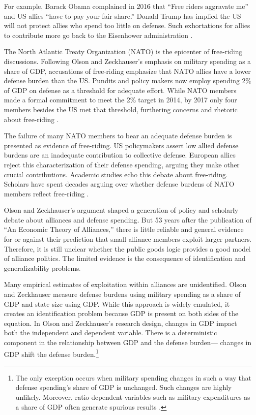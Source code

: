 \documentclass[12pt]{article}
\begin{document}
For example, Barack Obama complained in 2016 that ``Free riders aggravate me'' and US allies ``have to pay your fair share.'' 
Donald Trump has implied the US will not protect allies who spend too little on defense. 
Such exhortations for allies to contribute more go back to the Eisenhower administration \citep{Lanoszka2015}.


The North Atlantic Treaty Organization (NATO) is the epicenter of free-riding discussions. 
Following Olson and Zeckhauser's emphasis on military spending as a share of GDP, accusations of free-riding emphasize that NATO allies have a lower defense burden than the US. 
Pundits and policy makers now employ spending 2\% of GDP on defense as a threshold for adequate effort.
While NATO members made a formal commitment to meet the 2\% target in 2014, by 2017 only four members besides the US met that threshold, furthering concerns and rhetoric about free-riding \citep{EconomistNATO2017}. 


The failure of many NATO members to bear an adequate defense burden is presented as evidence of free-riding. 
US policymakers assert low allied defense burdens are an inadequate contribution to collective defense. 
European allies reject this characterization of their defense spending, arguing they make other crucial contributions. 
Academic studies echo this debate about free-riding.  
Scholars have spent decades arguing over whether defense burdens of NATO members reflect free-riding \citep{SandlerForbes1980, Palmer1990, GatesTerasawa1992, SandlerHartley2001, Lanoszka2015, PluemperNeumayer2015}.


Olson and Zeckhauser's argument shaped a generation of policy and scholarly debate about alliances and defense spending. 
But 53 years after the publication of ``An Economic Theory of Alliances,'' there is little reliable and general evidence for or against their prediction that small alliance members exploit larger partners. 
Therefore, it is still unclear whether the public goods logic provides a good model of alliance politics. 
The limited evidence is the consequence of identification and generalizability problems. 


Many empirical estimates of exploitation within alliances are unidentified.
Olson and Zeckhauser measure defense burdens using military spending as a share of GDP and state size using GDP.
While this approach is widely emulated, it creates an identification problem because GDP is present on both sides of the equation.
In Olson and Zeckhauser's research design, changes in GDP impact both the independent and dependent variable. 
There is a deterministic component in the relationship between GDP and the defense burden--- changes in GDP shift the defense burden.\footnote{
The only exception occurs when military spending changes in such a way that defense spending's share of GDP is unchanged. Such changes are highly unlikely. Moreover, ratio dependent variables such as military expenditures as a share of GDP often generate spurious results \citep{Kronmal1993}.}  
 
\end{document}
